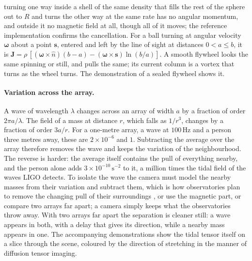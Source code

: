 turning one way inside a shell of the same density that fills the rest of the
sphere out to $R$ and turns the other way at the same rate has no angular momentum, and outside it no magnetic field at all,
though all of it moves; the reference implementation confirms the cancellation.
For a ball turning at angular velocity $\boldsymbol\omega$ about a point
$\mathbf{s}$, entered and left by the line of sight at distances $0 < a \le b$,
it is
$\mathbf{J} = \rho\,[(\boldsymbol\omega\times\hat n)(b-a)
- (\boldsymbol\omega\times\mathbf{s})\ln(b/a)]$. A smooth flywheel looks the
same spinning or still, and pulls the same; its current column is a vortex
that turns as the wheel turns. The demonstration of a sealed flywheel shows
it.

\paragraph{Variation across the array.} A wave of wavelength $\lambda$ changes
across an array of width $a$ by a fraction of order $2\pi a/\lambda$. The field
of a mass at distance $r$, which falls as $1/r^{3}$, changes by a fraction of
order $3a/r$. For a one-metre array, a wave at $100\,\mathrm{Hz}$ and a person
three metres away, these are $2\times10^{-6}$ and $1$. Subtracting the
average over the array therefore removes the wave and keeps the variation of
the neighbourhood. The reverse is harder: the average itself contains the pull
of everything nearby, and the person alone adds $3\times10^{-10}\,\mathrm{s^{-2}}$
to it, a million times the tidal field of the waves LIGO detects. To isolate
the wave the camera must model the nearby masses from their variation and
subtract them, which is how observatories plan to remove the changing pull of
their surroundings \cite{Harms2019,Chaibi2016}, or use the magnetic part, or
compare two arrays far apart; a camera simply keeps what the observatories
throw away. With two arrays far apart the separation is cleaner still: a wave
appears in both, with a delay that gives its direction, while a nearby mass
appears in one. The accompanying demonstrations show the tidal tensor itself
on a slice through the scene, coloured by the direction of stretching in the
manner of diffusion tensor imaging.

